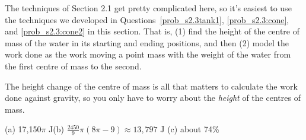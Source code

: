 \begin{hint}
The techniques of Section 2.1 get pretty complicated here, so it's easiest to use the techniques we developed in Questions~\ref{prob_s2.3tank1}, \ref{prob_s2.3:cone}, and \ref{prob_s2.3:cone2} in this section. That is, (1) find the height of the centre of mass of the water in its starting and ending positions, and then (2) model the work done as the work moving a point mass with the weight of the water from the first centre of mass to the second.

The height change of the centre of mass is all that matters to calculate the work done against gravity, so you only have to worry about the \emph{height} of the centres of mass.
\end{hint}
\begin{answer}
(a) 17,150$\pi$ J\qquad (b)
$\displaystyle\frac{2450}{9}\pi\left(8\pi-9\right)\approx 13,797\text{ J}$\qquad
(c) about 74\%
\end{answer}
